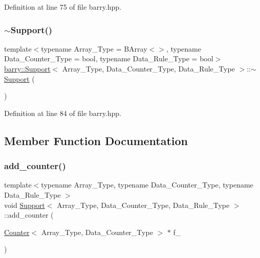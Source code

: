 Definition at line 75 of file barry.\+hpp.

\mbox{\label{classbarry_1_1_support_a4ea99cc1691b04b76a333e851aab4b64}} 
\subsubsection{\texorpdfstring{$\sim$\+Support()}{~Support()}}
{\footnotesize\ttfamily template$<$typename Array\+\_\+\+Type = B\+Array$<$$>$, typename Data\+\_\+\+Counter\+\_\+\+Type = bool, typename Data\+\_\+\+Rule\+\_\+\+Type = bool$>$ \\
\hyperlink{classbarry_1_1_support}{barry\+::\+Support}$<$ Array\+\_\+\+Type, Data\+\_\+\+Counter\+\_\+\+Type, Data\+\_\+\+Rule\+\_\+\+Type $>$\+::$\sim$\hyperlink{classbarry_1_1_support}{Support} (\begin{DoxyParamCaption}{ }\end{DoxyParamCaption})\hspace{0.3cm}{\ttfamily [inline]}}



Definition at line 84 of file barry.\+hpp.



\subsection{Member Function Documentation}
\mbox{\label{classbarry_1_1_support_a364df2c6295341f2801ebe0419d1d97c}} 
\subsubsection{\texorpdfstring{add\+\_\+counter()}{add\_counter()}\hspace{0.1cm}{\footnotesize\ttfamily [1/2]}}
{\footnotesize\ttfamily template$<$typename Array\+\_\+\+Type, typename Data\+\_\+\+Counter\+\_\+\+Type, typename Data\+\_\+\+Rule\+\_\+\+Type $>$ \\
void \hyperlink{classbarry_1_1_support}{Support}$<$ Array\+\_\+\+Type, Data\+\_\+\+Counter\+\_\+\+Type, Data\+\_\+\+Rule\+\_\+\+Type $>$\+::add\+\_\+counter (\begin{DoxyParamCaption}\item[{\hyperlink{classbarry_1_1_counter}{Counter}$<$ Array\+\_\+\+Type, Data\+\_\+\+Counter\+\_\+\+Type $>$ $\ast$}]{f\+\_\+ }\end{DoxyParamCaption})\hspace{0.3cm}{\ttfamily [inline]}}



